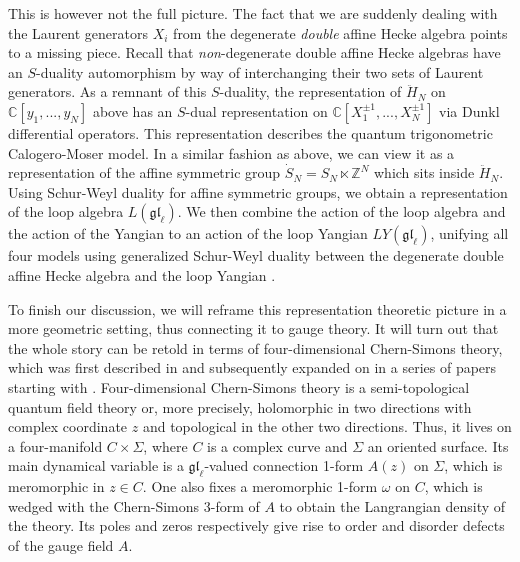 \documentclass[11pt]{report}
\theoremstyle{definition}
\theoremstyle{remark}
\theoremstyle{remark}
\newcommand{\Z}{\mathbb{Z}}
\newcommand{\C}{\mathbb{C}}
\begin{document}
This is however not the full picture. The fact that we are suddenly dealing with the Laurent generators $X_i$ from the degenerate \emph{double} affine Hecke algebra points to a missing piece. Recall that \emph{non}-degenerate double affine Hecke algebras have an $S$-duality automorphism by way of interchanging their two sets of Laurent generators. As a remnant of this $S$-duality, the representation of $\ddot H_N$ on $\C[y_1,...,y_N]$ above has an $S$-dual representation on $\C[X_1^{\pm 1},...,X_N^{\pm 1}]$ via Dunkl differential operators. This representation describes the quantum trigonometric Calogero-Moser model. In a similar fashion as above, we can view it as a representation of the affine symmetric group $\dot S_N = S_N \ltimes \Z^N$ which sits inside $\ddot H_N$. Using Schur-Weyl duality for affine symmetric groups, we obtain a representation of the loop algebra $L(\mathfrak{gl}_\ell)$. We then combine the action of the loop algebra and the action of the Yangian to an action of the loop Yangian $LY(\mathfrak{gl}_\ell)$, unifying all four models using generalized Schur-Weyl duality between the degenerate double affine Hecke algebra and the loop Yangian \cite{article:guay:2005}.%

To finish our discussion, we will reframe this representation theoretic picture in a more geometric setting, thus connecting it to gauge theory. It will turn out that the whole story can be retold in terms of four-dimensional Chern-Simons theory, which was first described in \cite{article:costello:2013} and subsequently expanded on in a series of papers starting with \cite{article:costello:2018}. Four-dimensional Chern-Simons theory is a semi-topological quantum field theory or, more precisely, holomorphic in two directions with complex coordinate $z$ and topological in the other two directions. Thus, it lives on a four-manifold $C \times \Sigma$, where $C$ is a complex curve and $\Sigma$ an oriented surface. Its main dynamical variable is a $\mathfrak{gl}_\ell$-valued connection 1-form $A(z)$ on $\Sigma$, which is meromorphic in $z \in C$. One also fixes a meromorphic 1-form $\omega$ on $C$, which is wedged with the Chern-Simons 3-form of $A$ to obtain the Langrangian density of the theory. Its poles and zeros respectively give rise to order and disorder defects of the gauge field $A$.
\end{document}
